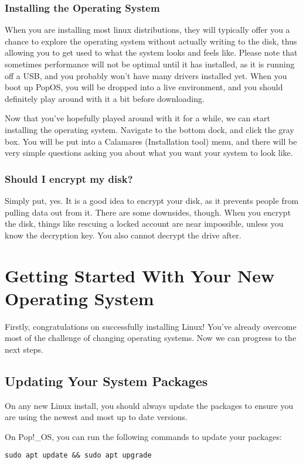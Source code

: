 \documentclass {report}
\begin{document}
\subsubsection{Installing the Operating System}
When you are installing most linux distributions, they will typically offer you a chance to explore the operating system without actually writing to the disk, thus allowing you to get used to what the system looks and feels like. Please note that sometimes performance will not be optimal until it has installed, as it is running off a USB, and you probably won't have many drivers installed yet. 
When you boot up PopOS, you will be dropped into a live environment, and you should definitely play around with it a bit before downloading. 

Now that you've hopefully played around with it for a while, we can start installing the operating system. Navigate to the bottom dock, and click the gray box. You will be put into a Calamares (Installation tool) menu, and there will be very simple questions asking you about what you want your system to look like. 

\subsubsection{Should I encrypt my disk?}
Simply put, yes. It is a good idea to encrypt your disk, as it prevents people from pulling data out from it. There are some downsides, though. When you encrypt the disk, things like rescuing a locked account are near impossible, unless you know the decryption key. You also cannot decrypt the drive after.



\section{Getting Started With Your New Operating System}

Firstly, congratulations on successfully installing Linux! You've already overcome most of the challenge of changing operating systems. Now we can progress to the next steps.

\subsection{Updating Your System Packages}
On any new Linux install, you should always update the packages to ensure you are using the newest and most up to date versions.

On Pop!\_OS, you can run the following commands to update your packages:
\begin{lstlisting}
sudo apt update && sudo apt upgrade
\end{lstlisting}
\end{document}
